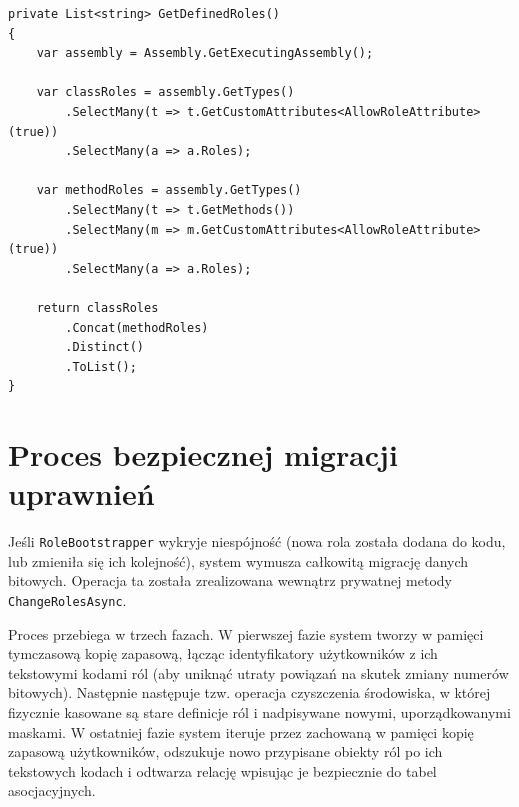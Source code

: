 \documentclass{SGGW-thesis}
\begin{document}
\vspace{2cm}

\begin{minipage}{\textwidth}
\begin{lstlisting}    
private List<string> GetDefinedRoles()
{
    var assembly = Assembly.GetExecutingAssembly();

    var classRoles = assembly.GetTypes()
        .SelectMany(t => t.GetCustomAttributes<AllowRoleAttribute>(true))
        .SelectMany(a => a.Roles);

    var methodRoles = assembly.GetTypes()
        .SelectMany(t => t.GetMethods())
        .SelectMany(m => m.GetCustomAttributes<AllowRoleAttribute>(true))
        .SelectMany(a => a.Roles);

    return classRoles
        .Concat(methodRoles)
        .Distinct()
        .ToList();
}
\end{lstlisting}
\end{minipage}

\vspace{2cm}

\section{Proces bezpiecznej migracji uprawnień}

Jeśli \texttt{RoleBootstrapper} wykryje niespójność (nowa rola została dodana do kodu, lub zmieniła się ich kolejność), system wymusza całkowitą migrację danych bitowych. Operacja ta została zrealizowana wewnątrz prywatnej metody \texttt{ChangeRolesAsync}. 

Proces przebiega w trzech fazach. W pierwszej fazie system tworzy w pamięci tymczasową kopię zapasową, łącząc identyfikatory użytkowników z ich tekstowymi kodami ról (aby uniknąć utraty powiązań na skutek zmiany numerów bitowych). Następnie następuje tzw. operacja czyszczenia środowiska, w której fizycznie kasowane są stare definicje ról i nadpisywane nowymi, uporządkowanymi maskami. W ostatniej fazie system iteruje przez zachowaną w pamięci kopię zapasową użytkowników, odszukuje nowo przypisane obiekty ról po ich tekstowych kodach i odtwarza relację wpisując je bezpiecznie do tabel asocjacyjnych.
\end{document}
